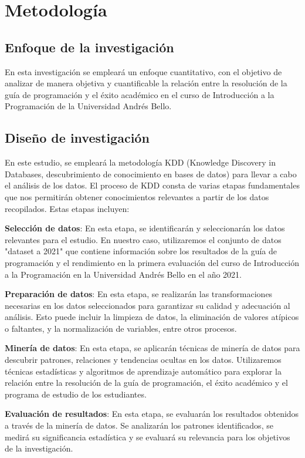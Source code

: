 \hypertarget{metodología}{%
    \section{Metodología}\label{Metodología}}
\vfill
\subsection*{Enfoque de la investigación}

En esta investigación se empleará un enfoque cuantitativo, con el objetivo de analizar de manera objetiva y cuantificable
la relación entre la resolución de la guía de programación y el éxito académico en el curso de Introducción a la
Programación de la Universidad Andrés Bello.
\vfill
\subsection*{Diseño de investigación}

En este estudio, se empleará la metodología KDD (Knowledge Discovery in Databases, descubrimiento de conocimiento en bases de datos) para llevar a cabo el análisis de los datos. El proceso de KDD consta de varias etapas fundamentales que nos permitirán obtener conocimientos relevantes a partir de los datos recopilados. Estas etapas incluyen:

\textbf{Selección de datos}: En esta etapa, se identificarán y seleccionarán los datos relevantes para el estudio. En nuestro caso, utilizaremos el conjunto de datos "dataset a 2021" que contiene información sobre los resultados de la guía de programación y el rendimiento en la primera evaluación del curso de Introducción a la Programación en la Universidad Andrés Bello en el año 2021.

\textbf{Preparación de datos}: En esta etapa, se realizarán las transformaciones necesarias en los datos seleccionados para garantizar su calidad y adecuación al análisis. Esto puede incluir la limpieza de datos, la eliminación de valores atípicos o faltantes, y la normalización de variables, entre otros procesos.

\textbf{Minería de datos}: En esta etapa, se aplicarán técnicas de minería de datos para descubrir patrones, relaciones y tendencias ocultas en los datos. Utilizaremos técnicas estadísticas y algoritmos de aprendizaje automático para explorar la relación entre la resolución de la guía de programación, el éxito académico y el programa de estudio de los estudiantes.

\textbf{Evaluación de resultados}: En esta etapa, se evaluarán los resultados obtenidos a través de la minería de datos. Se analizarán los patrones identificados, se medirá su significancia estadística y se evaluará su relevancia para los objetivos de la investigación.

